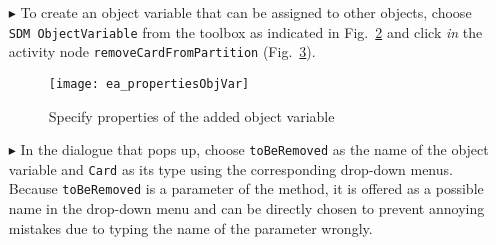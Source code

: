 \begin{itemize}
\begin{figure}[htpb]
\begin{center} 
  \texttt{[image: ea\_createStoryNode]}
  \caption{Start modelling story pattern in activity node}  
  \label{fig:story_pattern}
\end{center}
\end{figure}

The activity node should now have a single \emph{object variable}, \texttt{this}(Fig.~\ref{fig:tool_box}). Object variables are, as the
word ``variable'' indicates, place holders for actual objects in a model.  During \emph{pattern matching}, actual objects in the 
current model are assigned to the object variables in the pattern according to  the indicated type of the object variable and other conditions\footnote{We shall
learn what conditions can be specified in a few pages.}.  In our case, the current story pattern consists of only one object variable, which is assigned (per
convention) to \texttt{this} in Java (the object whose method is invoked).

\begin{figure}[htp]
\begin{center}
  \texttt{[image: ea\_sdmNewObjVar]}
  \caption{Add a new object variable from the tool-box}  
  \label{fig:tool_box}
\end{center}
\end{figure}

\item[$\blacktriangleright$] To create an object variable that can be assigned to other objects, choose \texttt{SDM ObjectVariable} from the toolbox as
indicated in Fig.~\ref{fig:tool_box} and click \emph{in} the activity node \texttt{removeCardFromPartition} (Fig.~\ref{fig:object_variable_properties}).

\begin{figure}[htp]
\begin{center}
  \texttt{[image: ea\_propertiesObjVar]}
  \caption{Specify properties of the added object variable}  
  \label{fig:object_variable_properties}
\end{center}
\end{figure}

\item[$\blacktriangleright$] In the dialogue that pops up, choose \texttt{toBeRemoved} as the name of the object variable and \texttt{Card} as its type using
the corresponding drop-down menus. Because \texttt{toBeRemoved} is a parameter of the method, it is offered as a possible name in the drop-down menu and can be
directly chosen to prevent annoying mistakes due to typing the name of the parameter wrongly.


\end{itemize}
